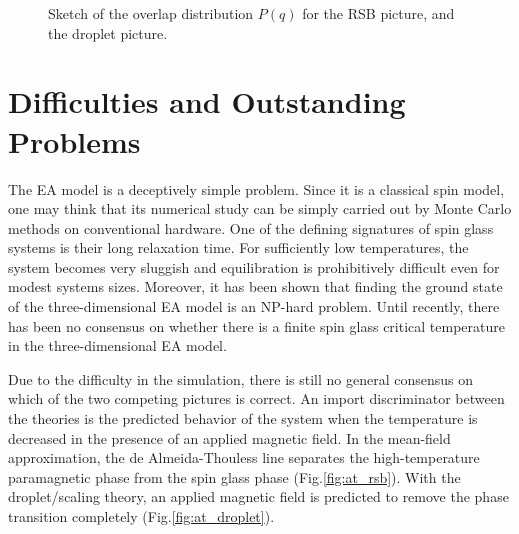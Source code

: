 \begin{figure}
  \centering 
  \hspace{0.5cm}
  \caption{Sketch of the overlap distribution $P(q)$ for the RSB picture, and the
droplet picture.}
  \label{fig:overlap}
\end{figure}


\section{Difficulties and Outstanding Problems}
The EA model is a deceptively simple problem. Since it is a classical spin 
model, one may think that its numerical study can be simply carried out by Monte
Carlo methods on conventional hardware. One of the defining signatures of spin glass 
systems is their long relaxation time. 
For sufficiently low temperatures, the system becomes very sluggish and 
equilibration is prohibitively difficult even for modest systems sizes. 
Moreover, it has been shown that finding the ground state of the three-dimensional
 EA model is an NP-hard problem. \cite{Barahona-1982} 
Until recently, there has been no consensus on whether there is a finite spin 
glass critical temperature in the three-dimensional EA model.


Due to the difficulty in the simulation, there is still no general consensus on
which of the two competing pictures is correct. 
An import discriminator between the theories is the predicted behavior of 
the system when the temperature is decreased in the presence of an applied magnetic
field. 
In the mean-field approximation, the de Almeida-Thouless line separates the 
high-temperature paramagnetic phase from the spin glass phase (Fig.\ref{fig:at_rsb}). 
With the droplet/scaling theory, an applied magnetic field is predicted to remove
the phase transition completely (Fig.\ref{fig:at_droplet}).


